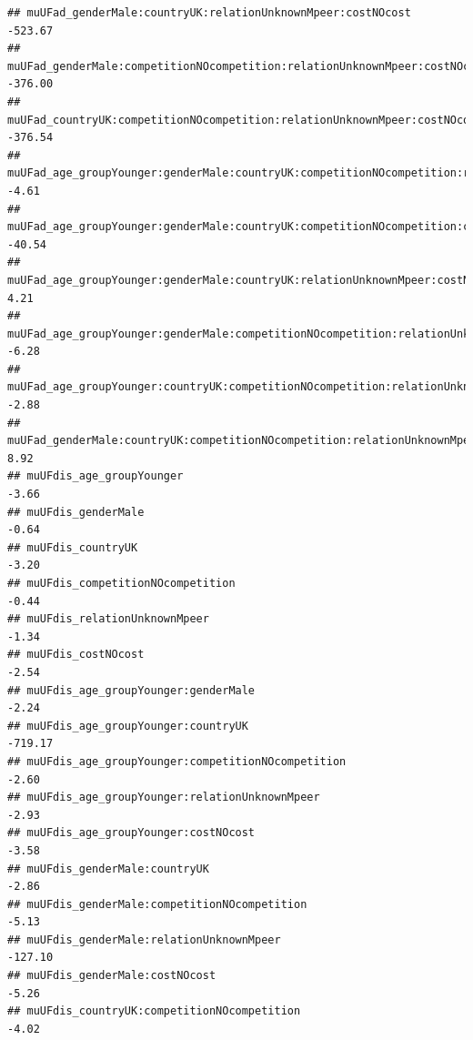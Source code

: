 \documentclass[
]{article}
\begin{document}
\begin{verbatim}
## muUFad_genderMale:countryUK:relationUnknownMpeer:costNOcost                                   -523.67
## muUFad_genderMale:competitionNOcompetition:relationUnknownMpeer:costNOcost                    -376.00
## muUFad_countryUK:competitionNOcompetition:relationUnknownMpeer:costNOcost                     -376.54
## muUFad_age_groupYounger:genderMale:countryUK:competitionNOcompetition:relationUnknownMpeer      -4.61
## muUFad_age_groupYounger:genderMale:countryUK:competitionNOcompetition:costNOcost               -40.54
## muUFad_age_groupYounger:genderMale:countryUK:relationUnknownMpeer:costNOcost                     4.21
## muUFad_age_groupYounger:genderMale:competitionNOcompetition:relationUnknownMpeer:costNOcost     -6.28
## muUFad_age_groupYounger:countryUK:competitionNOcompetition:relationUnknownMpeer:costNOcost      -2.88
## muUFad_genderMale:countryUK:competitionNOcompetition:relationUnknownMpeer:costNOcost             8.92
## muUFdis_age_groupYounger                                                                        -3.66
## muUFdis_genderMale                                                                              -0.64
## muUFdis_countryUK                                                                               -3.20
## muUFdis_competitionNOcompetition                                                                -0.44
## muUFdis_relationUnknownMpeer                                                                    -1.34
## muUFdis_costNOcost                                                                              -2.54
## muUFdis_age_groupYounger:genderMale                                                             -2.24
## muUFdis_age_groupYounger:countryUK                                                            -719.17
## muUFdis_age_groupYounger:competitionNOcompetition                                               -2.60
## muUFdis_age_groupYounger:relationUnknownMpeer                                                   -2.93
## muUFdis_age_groupYounger:costNOcost                                                             -3.58
## muUFdis_genderMale:countryUK                                                                    -2.86
## muUFdis_genderMale:competitionNOcompetition                                                     -5.13
## muUFdis_genderMale:relationUnknownMpeer                                                       -127.10
## muUFdis_genderMale:costNOcost                                                                   -5.26
## muUFdis_countryUK:competitionNOcompetition                                                      -4.02

\end{verbatim}
\end{document}
